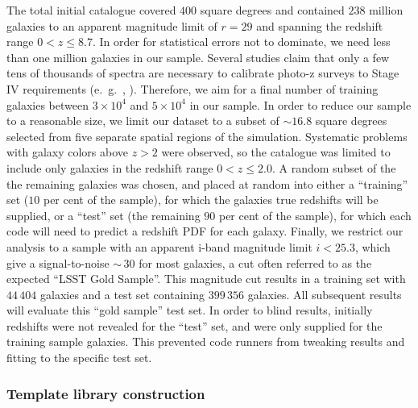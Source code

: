 The total initial catalogue covered $400$ square degrees and contained $238$ million galaxies to an apparent magnitude limit of $r\!=\!29$ and spanning the redshift range $0\!<\!z\!\leq\!8.7$.  In order for statistical errors not to dominate, we need less than one million galaxies in our sample.
Several studies claim that only a few tens of thousands of spectra are necessary to calibrate photo-z surveys to Stage IV requirements (e.~g.~\citet{Bernstein:10}, \citet{Masters:2017}).
Therefore, we aim for a final number of training galaxies between $3\times 10^{4}$ and $5\times 10^{4}$ in our sample.
In order to reduce our sample to a reasonable size, we limit our dataset to a subset of $\sim\!16.8$ square degrees selected from five separate spatial regions of the simulation.
Systematic problems with galaxy colors above $z\!>\!2$ were observed, so the catalogue was limited to include only galaxies in the redshift range $0\!<\!z\!\leq\!2.0$.
A random subset of the the remaining galaxies was chosen, and placed at random into either a ``training'' set ($10$ per cent of the sample), for which the galaxies true redshifts will be supplied, or a ``test'' set (the remaining $90$ per cent of the sample), for which each code will need to predict a redshift PDF for each galaxy.
Finally, we restrict our analysis to a sample with an apparent i-band magnitude limit $i<25.3$, which give a signal-to-noise $\sim\,30$ for most galaxies, a cut often referred to as the expected ``LSST Gold Sample''.
This magnitude cut results in a training set with $44\,404$ galaxies and a test set containing $399\,356$ galaxies.  All subsequent results will evaluate this ``gold sample'' test set.
In order to blind results, initially redshifts were not revealed for the ``test'' set, and were only supplied for the training sample galaxies.
This prevented code runners from tweaking results and fitting to the specific test set.

\subsubsection{Template library construction}
\label{sec:buzztemplates}

